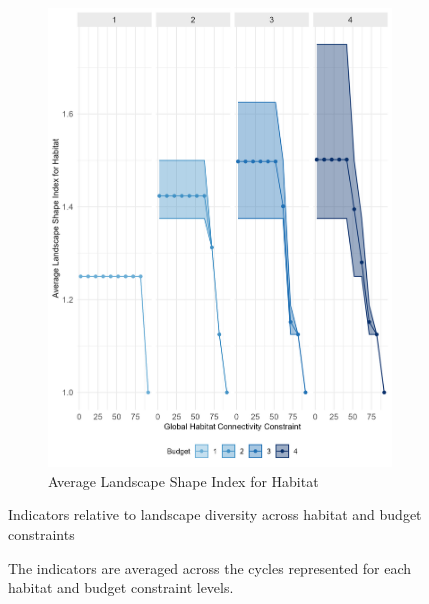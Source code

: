 \begin{figure}
\begin{subfigure}[b]{.48\textwidth}
        \includegraphics[height = .3\textheight]{figures/wildland/average_LSI_B.jpg}
        \caption{Average Landscape Shape Index for Habitat}
        \label{fig:lsi}
    \end{subfigure}
    
    \caption{Indicators relative to landscape diversity across habitat and budget constraints}
    \caption*{The indicators are averaged across the cycles represented for each habitat and budget constraint levels.}
    \label{fig:indicators2}
\end{figure}


